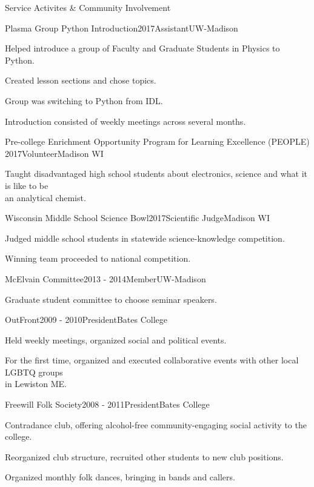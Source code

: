 \documentclass{resume}  %
\begin{document}
\begin{rSection}{Service Activites \& Community Involvement}
  \begin{rSubsection}{Plasma Group Python Introduction}{2017}{Assistant}{UW-Madison}
    \item Helped introduce a group of Faculty and Graduate Students in Physics to Python.
    \item Created lesson sections and chose topics.
    \item Group was switching to Python from IDL.
    \item Introduction consisted of weekly meetings across several months.
  \end{rSubsection}
  \begin{rSubsection}{Pre-college Enrichment Opportunity Program for Learning Excellence (PEOPLE)}
    {2017}{Volunteer}{Madison WI}
	  \item Taught disadvantaged high school students about electronics, science and what it is like
      to be \\ an analytical chemist.
  \end{rSubsection}
  \begin{rSubsection}{Wisconsin Middle School Science Bowl}{2017}{Scientific Judge}{Madison WI}
    \item Judged middle school students in statewide science-knowledge competition.
    \item Winning team proceeded to national competition.
  \end{rSubsection}
  \begin{rSubsection}{McElvain Committee}{2013 - 2014}{Member}{UW-Madison}
    \item Graduate student committee to choose seminar speakers.
  \end{rSubsection}
  \begin{rSubsection}{OutFront}{2009 - 2010}{President}{Bates College}
    \item Held weekly meetings, organized social and political events.
    \item For the first time, organized and executed collaborative events with other local LGBTQ
      groups \\ in Lewiston ME.
  \end{rSubsection}
  \begin{rSubsection}{Freewill Folk Society}{2008 - 2011}{President}{Bates College}
    \item Contradance club, offering alcohol-free community-engaging social activity to the college.
    \item Reorganized club structure, recruited other students to new club positions.
    \item Organized monthly folk dances, bringing in bands and callers.
  \end{rSubsection}
\end{rSection}
\end{document}
